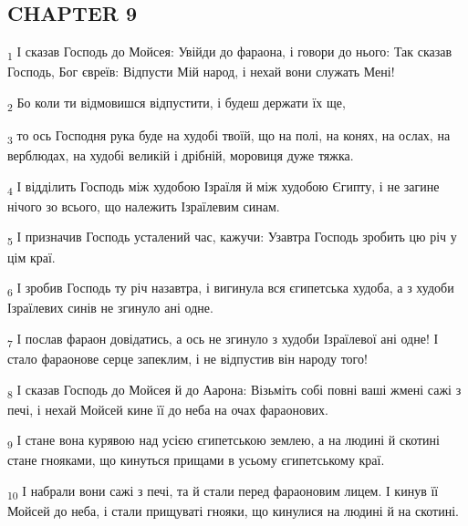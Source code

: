 \subsection{CHAPTER 9}
\begin{tcolorbox}
\textsubscript{1} І сказав Господь до Мойсея: Увійди до фараона, і говори до нього: Так сказав Господь, Бог євреїв: Відпусти Мій народ, і нехай вони служать Мені!
\end{tcolorbox}
\begin{tcolorbox}
\textsubscript{2} Бо коли ти відмовишся відпустити, і будеш держати їх ще,
\end{tcolorbox}
\begin{tcolorbox}
\textsubscript{3} то ось Господня рука буде на худобі твоїй, що на полі, на конях, на ослах, на верблюдах, на худобі великій і дрібній, моровиця дуже тяжка.
\end{tcolorbox}
\begin{tcolorbox}
\textsubscript{4} І відділить Господь між худобою Ізраїля й між худобою Єгипту, і не загине нічого зо всього, що належить Ізраїлевим синам.
\end{tcolorbox}
\begin{tcolorbox}
\textsubscript{5} І призначив Господь усталений час, кажучи: Узавтра Господь зробить цю річ у цім краї.
\end{tcolorbox}
\begin{tcolorbox}
\textsubscript{6} І зробив Господь ту річ назавтра, і вигинула вся єгипетська худоба, а з худоби Ізраїлевих синів не згинуло ані одне.
\end{tcolorbox}
\begin{tcolorbox}
\textsubscript{7} І послав фараон довідатись, а ось не згинуло з худоби Ізраїлевої ані одне! І стало фараонове серце запеклим, і не відпустив він народу того!
\end{tcolorbox}
\begin{tcolorbox}
\textsubscript{8} І сказав Господь до Мойсея й до Аарона: Візьміть собі повні ваші жмені сажі з печі, і нехай Мойсей кине її до неба на очах фараонових.
\end{tcolorbox}
\begin{tcolorbox}
\textsubscript{9} І стане вона курявою над усією єгипетською землею, а на людині й скотині стане гнояками, що кинуться прищами в усьому єгипетському краї.
\end{tcolorbox}
\begin{tcolorbox}
\textsubscript{10} І набрали вони сажі з печі, та й стали перед фараоновим лицем. І кинув її Мойсей до неба, і стали прищуваті гнояки, що кинулися на людині й на скотині.
\end{tcolorbox}
